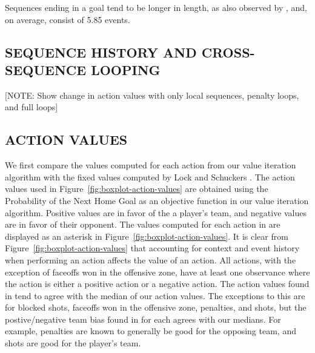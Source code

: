 \documentclass[]{article}
\begin{document}
Sequences ending in a goal tend to be longer in length, as also observed by \citep{Thomas2012}, and, on average, consist of 5.85 events.


\subsection{SEQUENCE HISTORY AND CROSS-SEQUENCE LOOPING}

[NOTE: Show change in action values with only local sequences, penalty loops, and full loops]

\subsection{ACTION VALUES}

We first compare the values computed for each action from our value iteration algorithm with the fixed values computed by Lock and Schuckers \citep{Lock2009,Schuckers2011}. The action values used in Figure~\ref{fig:boxplot-action-values} are obtained using the Probability of the Next Home Goal as an objective function in our value iteration algorithm. Positive values are in favor of the a player's team, and negative values are in favor of their opponent. The values computed for each action in \citep{Lock2009} are displayed as an asterisk in Figure~\ref{fig:boxplot-action-values}. It is clear from Figure~\ref{fig:boxplot-action-values} that accounting for context and event history when performing an action affects the value of an action. All actions, with the exception of faceoffs won in the offensive zone, have at least one observance where the action is either a positive action or a negative action. The action values found in \citep{Lock2009} tend to agree with the median of our action values. The exceptions to this are for blocked shots, faceoffs won in the offensive zone, penalties, and shots, but the postive/negative team bias found in \citep{Lock2009} for each agrees with our medians. For example, penalties are known to generally be good for the opposing team, and shots are good for the player's team.
\end{document}

